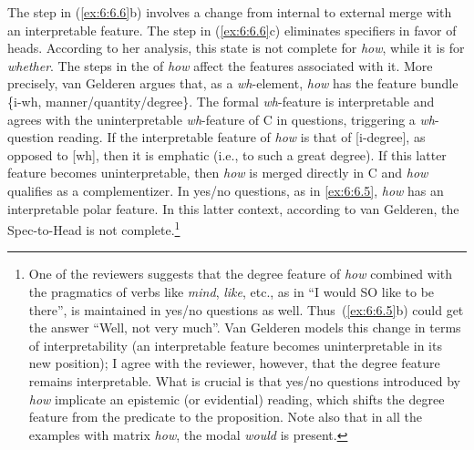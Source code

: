 \documentclass[output=paper]{langsci/langscibook}
\begin{document}
The step in (\ref{ex:6:6.6}b) involves a change from internal to external
merge with an interpretable feature. The step in (\ref{ex:6:6.6}c) eliminates
specifiers in favor of heads. According to her analysis, this state is not
complete for \emph{how}, while it is for \emph{whether}. The steps in the
 of \emph{how} affect the features associated with it. More
precisely, van Gelderen argues that, as a \emph{wh}-element, \emph{how} has the
feature bundle \{i\nobreakdash-wh, manner/quantity/degree\}. The formal \emph{wh}-feature
is interpretable and agrees with the uninterpretable \emph{wh}-feature of C in
questions, triggering a \emph{wh}-question reading. If the interpretable
feature of \emph{how} is that of [i-degree], as opposed to [wh], then it is
emphatic (i.e., to such a great degree). If this latter feature becomes
uninterpretable, then \emph{how} is merged directly in C and \emph{how}
qualifies as a complementizer. In yes/no questions, as in
\eqref{ex:6:6.5}, \emph{how} has an interpretable polar feature. In this
latter context, according to van Gelderen, the Spec-to-Head  is
not complete.\footnote{One of the reviewers suggests that the degree feature of
    \emph{how} combined with the pragmatics of verbs like \emph{mind},
    \emph{like}, etc., as in “I would SO like to be there”, is maintained in
    yes/no questions as well. Thus~(\ref{ex:6:6.5}b) could get the answer “Well, not very
    much”. Van Gelderen models this change in terms of interpretability (an
    interpretable feature becomes uninterpretable in its new position); I agree
    with the reviewer, however, that the degree feature remains interpretable.
    What is crucial is that yes/no questions introduced by \emph{how} implicate
    an epistemic (or evidential) reading, which shifts the degree feature from
    the predicate to the proposition.  Note also that in all the examples with
matrix \emph{how}, the modal \emph{would} is present.}
\end{document}
